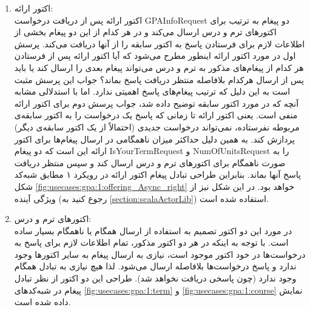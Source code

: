 \begin{enumerate}


\FloatBarrier
\item اکتور ارائه:\\
اکتور ارائه پس از دریافت درخواست GPAInfoRequest دو پیغام به ترتیب برای اکتور‌های ترم و درس ارسال می‌کند و در هر کدام از این دو پیغام بخشی از اطلاعات لازم برای فرستادن پاسخ به اکتور سابقه را از آنها دریافت می‌کند.
پرسش اول در مورد اکتور ارائه اینطور مطرح می‌شود که آیا اکتور ارائه پس از فرستادن هر کدام از پیغام‌های مذکور به ترم و درس می‌تواند پیغام بعدی را ارسال کند یا باید پس از ارسال هرکدام بلافاصله منتظر دریافت پاسخ بماند؟ جواب این پرسش مثبت است به این دلیل که ترتیب پیغام‌های پاسخ اهمیتی ندارد. اما با استدلالی مشابه آنچه که در مورد اکتور سابقه توضیح داده شد، جواب پرسش دوم برای اکتور ارائه منفی است. یعنی اکتور ارائه تا زمانی که پاسخ یک درخواست را به اکتور سابقه‌ی مربوطه نفرستاده، نمی‌تواند درخواست جدیدی (احتمالاً از یک اکتور سابقه‌ی دیگر) پردازش کند. به همین دلیل حداکثر میزان ناهمگامی در ارسال پیغام‌ها برای اکتور ارائه این است که دو پیغام IsYourTermRequest و  NumOfUnitsRequest را به صورت ناهمگام برای اکتورهای ترم و درس ارسال کند و سپس منتظر دریافت پاسخ آنها بماند. بنابراین طراحی تبادل پیغام اکتور ارائه در رویکرد ۱ مطابق شبه‌کد شکل \ref{fig:usecases:gpa:1:offering_Async_right}  خواهد بود. در این شکل نیز از ویژگی آینده (رجوع کنید به \ref{section:scalaActorLib}) استفاده شده است.
\FloatBarrier
\item اکتورهای ترم و درس:\\
در مورد  این دو اکتور تصمیم به استفاده از ارسال همگام یا ناهمگام بسیار ساده است. با توجه به اینکه در هر دو اکتور مذکور، تمام اطلاعات لازم برای پاسخ به درخواست‌ها در خود اکتور موجود است، نیازی به ارسال پیغام به سایر اکتورها وجود ندارد و پاسخ درخواست‌ها بلافاصله ارسال می‌شود. لذا هیچ نیازی به تبادل همگام وجود ندارد (چون پاسخی دریافت نخواهد شد). طراحی این دو اکتور از نظر تبادل پیغام در شبه‌کدهای \ref{fig:usecases:gpa:1:term}  و \ref{fig:usecases:gpa:1:course}  نمایش داده شده است.
\FloatBarrier

\end{enumerate}

